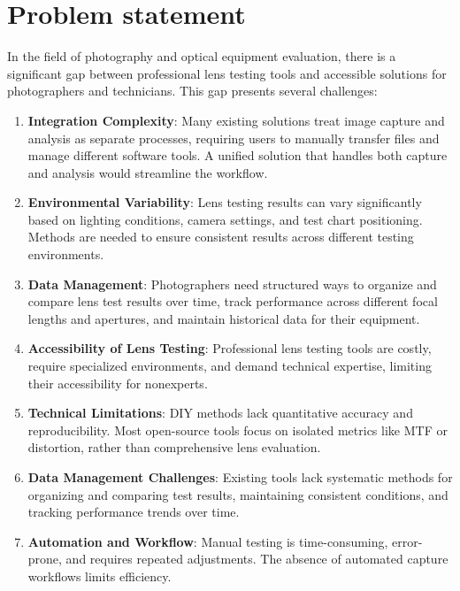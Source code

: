 \section*{Problem statement}
In the field of photography and optical equipment evaluation, there is a significant gap between professional lens testing tools and accessible solutions for photographers and technicians. This gap presents several challenges:

\begin{enumerate}
    \item \textbf{Integration Complexity}: Many existing solutions treat image capture and analysis as separate processes, requiring users to manually transfer files and manage different software tools. A unified solution that handles both capture and analysis would streamline the workflow.
    
    \item \textbf{Environmental Variability}: Lens testing results can vary significantly based on lighting conditions, camera settings, and test chart positioning. Methods are needed to ensure consistent results across different testing environments.
    
    \item \textbf{Data Management}: Photographers need structured ways to organize and compare lens test results over time, track performance across different focal lengths and apertures, and maintain historical data for their equipment.

    \item \textbf{Accessibility of Lens Testing}: Professional lens testing tools are costly, require specialized environments, and demand technical expertise, limiting their accessibility for nonexperts.
        
    \item \textbf{Technical Limitations}: DIY methods lack quantitative accuracy and reproducibility. Most open-source tools focus on isolated metrics like MTF or distortion, rather than comprehensive lens evaluation.
        
    \item \textbf{Data Management Challenges}: Existing tools lack systematic methods for organizing and comparing test results, maintaining consistent conditions, and tracking performance trends over time.

    \item \textbf{Automation and Workflow}: Manual testing is time-consuming, error-prone, and requires repeated adjustments. The absence of automated capture workflows limits efficiency.

\end{enumerate}

